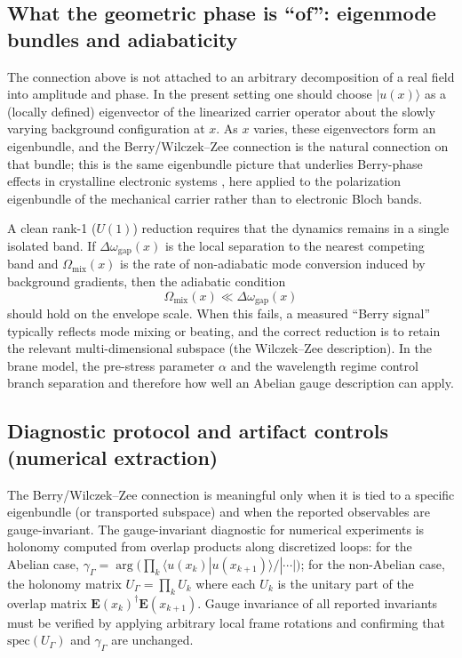 \subsection{What the geometric phase is ``of'': eigenmode bundles and adiabaticity}
\label{subsec:berry-of}

The connection above is not attached to an arbitrary decomposition of a real field into amplitude and phase.
In the present setting one should choose $\lvert u(x)\rangle$ as a (locally defined) eigenvector of the
linearized carrier operator about the slowly varying background configuration at $x$.
As $x$ varies, these eigenvectors form an eigenbundle, and the Berry/Wilczek--Zee connection is the natural
connection on that bundle; this is the same eigenbundle picture that underlies Berry-phase effects in
crystalline electronic systems \citep{XiaoChangNiu2010Berry}, here applied to the polarization eigenbundle of
the mechanical carrier rather than to electronic Bloch bands.

A clean rank-1 ($U(1)$) reduction requires that the dynamics remains in a single isolated band.
If $\Delta\omega_{\mathrm{gap}}(x)$ is the local separation to the nearest competing band and
$\Omega_{\mathrm{mix}}(x)$ is the rate of non-adiabatic mode conversion induced by background gradients,
then the adiabatic condition
\begin{equation}
  \Omega_{\mathrm{mix}}(x)\ll \Delta\omega_{\mathrm{gap}}(x)
  \label{eq:adiabatic-condition}
\end{equation}
should hold on the envelope scale.
When this fails, a measured ``Berry signal'' typically reflects mode mixing or beating, and the correct reduction
is to retain the relevant multi-dimensional subspace (the Wilczek--Zee description).
In the brane model, the pre-stress parameter $\alpha$ and the wavelength regime control branch separation and
therefore how well an Abelian gauge description can apply.

\subsection{Diagnostic protocol and artifact controls (numerical extraction)}
\label{subsec:diagnostic-protocol}

The Berry/Wilczek--Zee connection is meaningful only when it is tied to a specific eigenbundle (or transported
subspace) and when the reported observables are gauge-invariant.
The gauge-invariant diagnostic for numerical experiments is holonomy computed from overlap products along discretized loops: for the Abelian case, $\gamma_\Gamma = \arg\!\big(\prod_k \langle u(x_k)|u(x_{k+1})\rangle/|\cdots|\big)$; for the non-Abelian case, the holonomy matrix $U_\Gamma = \prod_k U_k$ where each $U_k$ is the unitary part of the overlap matrix $\mathbf{E}(x_k)^\dagger\mathbf{E}(x_{k+1})$.
Gauge invariance of all reported invariants must be verified by applying arbitrary local frame rotations and confirming that $\mathrm{spec}(U_\Gamma)$ and $\gamma_\Gamma$ are unchanged.

